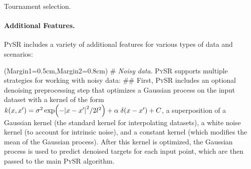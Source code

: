 \documentclass[letterpaper,twocolumn]{scrartcl}
\newcommand\pysr{\textsc{PySR}\xspace}
\begin{document}
\begin{linenumbers}

\begin{algorithm}[h!]
\algsize
\DontPrintSemicolon
{}
\BlankLine
{}
\BlankLine
{}
\caption{Tournament selection.\label{alg:tournament} }
\end{algorithm}






\paragraph{Additional Features.}
\pysr includes a variety of additional features for various types of data and scenarios:

\begin{easylist}[itemize]
\ListProperties(Margin1=0.5cm,Margin2=0.8cm)
# \textit{Noisy data.} \pysr supports multiple strategies for working with noisy data:
## First, \pysr includes an optional denoising preprocessing step that optimizes a Gaussian process on the input dataset with a kernel of the form $k(x,x')=\sigma^2\exp(-\abs{x-x'}^2 / 2 l^2) + \alpha\;\delta(x-x') + C$, a superposition of a Gaussian kernel (the standard kernel for interpolating datasets), a white noise kernel (to account for intrinsic noise), and a constant kernel (which modifies the mean of the Gaussian process).
After this kernel is optimized, the Gaussian process is used to predict denoised targets for each input point, which are then passed to the main \pysr algorithm.


\end{easylist}
\end{linenumbers}
\end{document}
